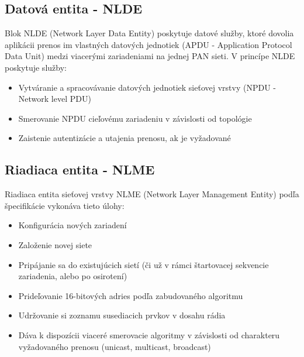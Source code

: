 \subsection{Datová entita - NLDE}
\indent\indent Blok NLDE  (Network Layer Data Entity) poskytuje datové služby, ktoré dovolia aplikácii prenos im vlastných datových jednotiek (APDU - Application Protocol Data Unit) medzi viacerými zariadeniami na jednej PAN sieti. V princípe NLDE poskytuje služby:
\begin{itemize}
\item Vytváranie a spracovávanie datových jednotiek sieťovej vrstvy (NPDU - Network level PDU)
\item Smerovanie NPDU cieľovému zariadeniu v závislosti od topológie
\item Zaistenie autentizácie a utajenia prenosu, ak je vyžadované
\end{itemize}
\subsection{Riadiaca entita - NLME}
\indent\indent Riadiaca entita sieťovej vrstvy NLME (Network Layer Management Entity) podľa špecifikácie vykonáva tieto úlohy:
\begin{itemize}
\item Konfigurácia nových zariadení
\item Založenie novej siete
\item Pripájanie sa do existujúcich sietí (či už v rámci štartovacej sekvencie zariadenia, alebo po osirotení)
\item Prideľovanie 16-bitových adries podľa zabudovaného algoritmu
\item Udržovanie si zoznamu susediacich prvkov v dosahu rádia
\item Dáva k dispozícii viaceré smerovacie algoritmy v závislosti od charakteru vyžadovaného prenosu (unicast, multicast, broadcast)
\end{itemize}
